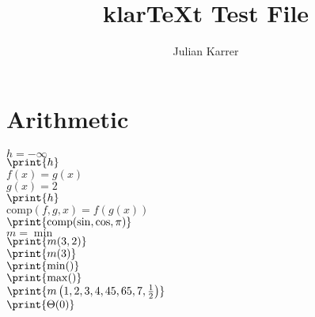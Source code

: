 \documentclass[oneside, a4paper]{article}
\author{Julian Karrer}
\title{klarTeXt Test File}
\begin{document}
\maketitle
\section*{Arithmetic}

\begin{program}

$h = - \infty$\\
$\print{h}$\\
$f(x) = g(x)$\\
$g(x) = 2$\\
$\print{h}$\\
$\text{comp}(f,g,x) = f(g(x))$\\
$\print{\text{comp}(\sin,\cos,\pi)}$\\
$m = \min$\\
$\print{m (3,2)}$\\
$\print{m (3)}$\\
$\print{\min ()}$\\
$\print{\max ()}$\\
$\print{m\left(1,2,3,4,45,65,7,\frac{1}{2}\right)}$\\
$\print{\Theta(0)}$\\


\end{program}
\end{document}
